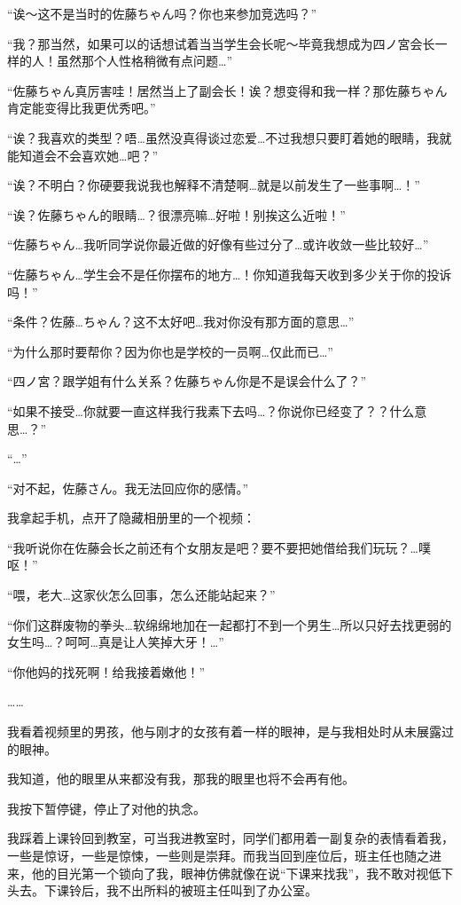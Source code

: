 \cutlinesa

“诶～这不是当时的佐藤ちゃん吗？你也来参加竞选吗？”

“我？那当然，如果可以的话想试着当当学生会长呢～毕竟我想成为四ノ宮会长一样的人！虽然那个人性格稍微有点问题…”

“佐藤ちゃん真厉害哇！居然当上了副会长！诶？想变得和我一样？那佐藤ちゃん肯定能变得比我更优秀吧。”

“诶？我喜欢的类型？唔…虽然没真得谈过恋爱…不过我想只要盯着她的眼睛，我就能知道会不会喜欢她…吧？”

“诶？不明白？你硬要我说我也解释不清楚啊…就是以前发生了一些事啊…！”

“诶？佐藤ちゃん的眼睛…？很漂亮嘛…好啦！别挨这么近啦！”

\cutlinesb

“佐藤ちゃん…我听同学说你最近做的好像有些过分了…或许收敛一些比较好…”

“佐藤ちゃん…学生会不是任你摆布的地方…！你知道我每天收到多少关于你的投诉吗！”

“条件？佐藤…ちゃん？这不太好吧…我对你没有那方面的意思…”

“为什么那时要帮你？因为你也是学校的一员啊…仅此而已…”

“四ノ宮？跟学姐有什么关系？佐藤ちゃん你是不是误会什么了？”

“如果不接受…你就要一直这样我行我素下去吗…？你说你已经变了？？什么意思…？”

“…”

“对不起，佐藤さん。我无法回应你的感情。”

\cutlines

我拿起手机，点开了隐藏相册里的一个视频：

“我听说你在佐藤会长之前还有个女朋友是吧？要不要把她借给我们玩玩？…噗呕！”

“喂，老大…这家伙怎么回事，怎么还能站起来？”

“你们这群废物的拳头…软绵绵地加在一起都打不到一个男生…所以只好去找更弱的女生吗…？呵呵…真是让人笑掉大牙！…”

“你他妈的找死啊！给我接着嫩他！”

……

我看着视频里的男孩，他与刚才的女孩有着一样的眼神，是与我相处时从未展露过的眼神。

我知道，他的眼里从来都没有我，那我的眼里也将不会再有他。

我按下暂停键，停止了对他的执念。

\cutlineb

我踩着上课铃回到教室，可当我进教室时，同学们都用着一副复杂的表情看着我，一些是惊讶，一些是惊悚，一些则是崇拜。而我当回到座位后，班主任也随之进来，他的目光第一个锁向了我，眼神仿佛就像在说“下课来找我”，我不敢对视低下头去。下课铃后，我不出所料的被班主任叫到了办公室。

